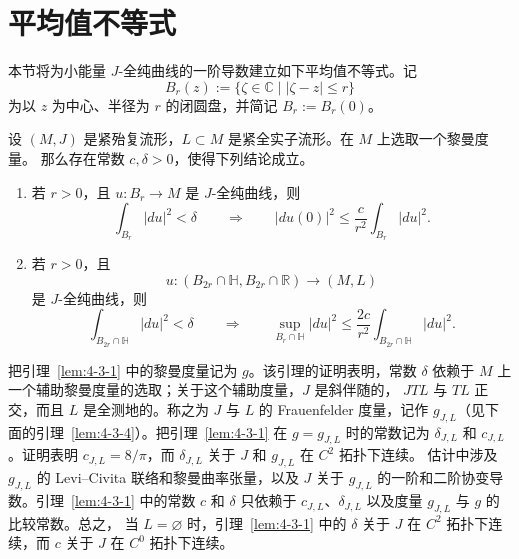 
\section{平均值不等式}\label{sec:4-3}

本节将为小能量 $J$-全纯曲线的一阶导数建立如下平均值不等式。记
\[
  B_r(z):=\{\zeta\in\mathbb C\mid |\zeta-z|\le r\}
\]
为以 $z$ 为中心、半径为 $r$ 的闭圆盘，并简记 $B_r:=B_r(0)$。

\begin{lemma}\label{lem:4-3-1}
设 $(M,J)$ 是紧殆复流形，$L\subset M$ 是紧全实子流形。在 $M$ 上选取一个黎曼度量。
那么存在常数 $c,\delta>0$，使得下列结论成立。
\begin{enumerate}[label=\textup{(\roman*)},leftmargin=3em]
\item 若 $r>0$，且 $u:B_r\to M$ 是 $J$-全纯曲线，则
\[
  \int_{B_r}|du|^2<\delta
  \qquad\Longrightarrow\qquad
  |du(0)|^2
  \le\frac{c}{r^2}\int_{B_r}|du|^2.
\]
\item 若 $r>0$，且
\[
  u:(B_{2r}\cap\mathbb H,B_{2r}\cap\mathbb R)
  \longrightarrow(M,L)
\]
是 $J$-全纯曲线，则
\[
  \int_{B_{2r}\cap\mathbb H}|du|^2<\delta
  \qquad\Longrightarrow\qquad
  \sup_{B_r\cap\mathbb H}|du|^2
  \le\frac{2c}{r^2}
  \int_{B_{2r}\cap\mathbb H}|du|^2.
\]
\end{enumerate}
\end{lemma}

\begin{remark}\label{rem:4-3-2}
把引理~\ref{lem:4-3-1} 中的黎曼度量记为 $g$。该引理的证明表明，常数 $\delta$
依赖于 $M$ 上一个辅助黎曼度量的选取；关于这个辅助度量，$J$ 是斜伴随的，
$JTL$ 与 $TL$ 正交，而且 $L$ 是全测地的。称之为 $J$ 与 $L$ 的 Frauenfelder 度量，记作
$g_{J,L}$（见下面的引理~\ref{lem:4-3-4}）。把引理~\ref{lem:4-3-1} 在
$g=g_{J,L}$ 时的常数记为 $\delta_{J,L}$ 和 $c_{J,L}$。证明表明
$c_{J,L}=8/\pi$，而 $\delta_{J,L}$ 关于 $J$ 和 $g_{J,L}$ 在 $C^2$ 拓扑下连续。
估计中涉及 $g_{J,L}$ 的 Levi--Civita 联络和黎曼曲率张量，以及 $J$ 关于
$g_{J,L}$ 的一阶和二阶协变导数。引理~\ref{lem:4-3-1} 中的常数 $c$ 和 $\delta$
只依赖于 $c_{J,L}$、$\delta_{J,L}$ 以及度量 $g_{J,L}$ 与 $g$ 的比较常数。总之，
当 $L=\varnothing$ 时，引理~\ref{lem:4-3-1} 中的 $\delta$ 关于 $J$ 在 $C^2$
拓扑下连续，而 $c$ 关于 $J$ 在 $C^0$ 拓扑下连续。
\end{remark}

